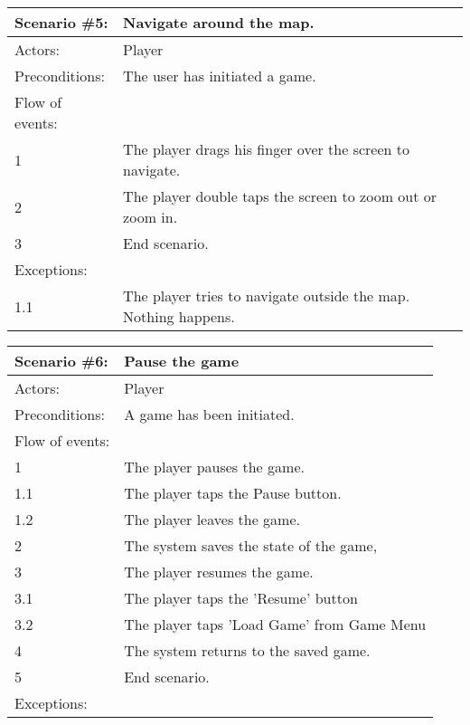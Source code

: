 \begin{tabular}{| l | p{10cm} |}
	\hline
	{\bf Scenario \#5:} & {\bf Navigate around the map.} \\ \hline
	Actors: & Player \\ \hline
	Preconditions: & The user has initiated a game. \\ \hline
	Flow of events: & \\ \hline
	1 & The player drags his finger over the screen to navigate. \\ \hline
	2 & The player double taps the screen to zoom out or zoom in. \\ \hline
	3 & End scenario. \\ \hline
	Exceptions: & \\ \hline
	1.1 & The player tries to navigate outside the map. Nothing happens. \\ \hline
\end{tabular}

\begin{tabular}{| l | p{10cm} |}
	\hline
	{\bf Scenario \#6:} & {\bf Pause the game} \\ \hline
	Actors: & Player \\ \hline
	Preconditions: & A game has been initiated. \\ \hline
	Flow of events: & \\ \hline
	1 & The player pauses the game. \\ \hline
	1.1 & The player taps the Pause button. \\ \hline
	1.2 & The player leaves the game. \\ \hline
	2 & The system saves the state of the game, \\ \hline
	3 & The player resumes the game. \\ \hline
	3.1 & The player taps the 'Resume' button \\ \hline
	3.2 & The player taps 'Load Game' from Game Menu \\ \hline
	4 & The system returns to the saved game. \\ \hline
	5 & End scenario. \\ \hline
	Exceptions: & \\ \hline
\end{tabular}

